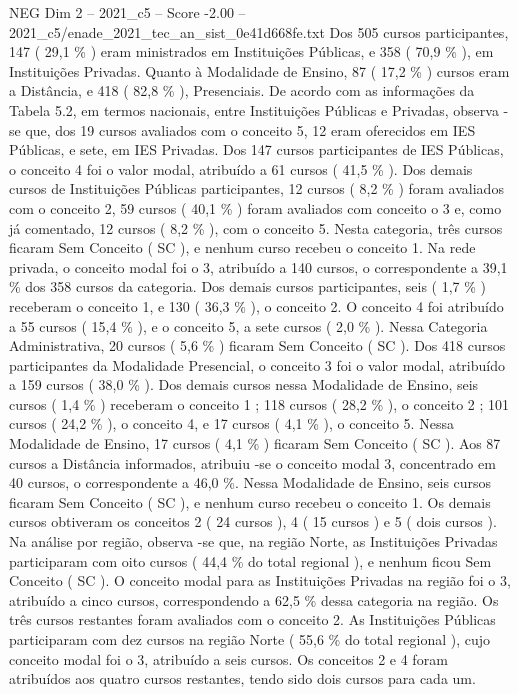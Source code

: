 \begin{textsample}{NEG Dim 2 – 2021\_c5 – Score -2.00 – 2021\_c5/enade\_2021\_tec\_an\_sist\_0e41d668fe.txt}
Dos 505 cursos participantes, 147 ( 29,1 \% ) eram ministrados em Instituições Públicas, e 358 ( 70,9 \% ), em Instituições Privadas.
Quanto à Modalidade de Ensino, 87 ( 17,2 \% ) cursos eram a Distância, e 418 ( 82,8 \% ), Presenciais.
De acordo com as informações da Tabela 5.2, em termos nacionais, entre Instituições Públicas e Privadas, observa -se que, dos 19 cursos avaliados com o conceito 5, 12 eram oferecidos em IES Públicas, e sete, em IES Privadas.
Dos 147 cursos participantes de IES Públicas, o conceito 4 foi o valor modal, atribuído a 61 cursos ( 41,5 \% ).
Dos demais cursos de Instituições Públicas participantes, 12 cursos ( 8,2 \% ) foram avaliados com o conceito 2, 59 cursos ( 40,1 \% ) foram avaliados com conceito o 3 e, como já comentado, 12 cursos ( 8,2 \% ), com o conceito 5.
Nesta categoria, três cursos ficaram Sem Conceito ( SC ), e nenhum curso recebeu o conceito 1.
Na rede privada, o conceito modal foi o 3, atribuído a 140 cursos, o correspondente a 39,1 \% dos 358 cursos da categoria.
Dos demais cursos participantes, seis ( 1,7 \% ) receberam o conceito 1, e 130 ( 36,3 \% ), o conceito 2.
O conceito 4 foi atribuído a 55 cursos ( 15,4 \% ), e o conceito 5, a sete cursos ( 2,0 \% ).
Nessa Categoria Administrativa, 20 cursos ( 5,6 \% ) ficaram Sem Conceito ( SC ).
Dos 418 cursos participantes da Modalidade Presencial, o conceito 3 foi o valor modal, atribuído a 159 cursos ( 38,0 \% ).
Dos demais cursos nessa Modalidade de Ensino, seis cursos ( 1,4 \% ) receberam o conceito 1 ; 118 cursos ( 28,2 \% ), o conceito 2 ; 101 cursos ( 24,2 \% ), o conceito 4, e 17 cursos ( 4,1 \% ), o conceito 5.
Nessa Modalidade de Ensino, 17 cursos ( 4,1 \% ) ficaram Sem Conceito ( SC ).
Aos 87 cursos a Distância informados, atribuiu -se o conceito modal 3, concentrado em 40 cursos, o correspondente a 46,0 \%.
Nessa Modalidade de Ensino, seis cursos ficaram Sem Conceito ( SC ), e nenhum curso recebeu o conceito 1.
Os demais cursos obtiveram os conceitos 2 ( 24 cursos ), 4 ( 15 cursos ) e 5 ( dois cursos ).
Na análise por região, observa -se que, na região Norte, as Instituições Privadas participaram com oito cursos ( 44,4 \% do total regional ), e nenhum ficou Sem Conceito ( SC ).
O conceito modal para as Instituições Privadas na região foi o 3, atribuído a cinco cursos, correspondendo a 62,5 \% dessa categoria na região.
Os três cursos restantes foram avaliados com o conceito 2.
As Instituições Públicas participaram com dez cursos na região Norte ( 55,6 \% do total regional ), cujo conceito modal foi o 3, atribuído a seis cursos.
Os conceitos 2 e 4 foram atribuídos aos quatro cursos restantes, tendo sido dois cursos para cada um.

\end{textsample}
